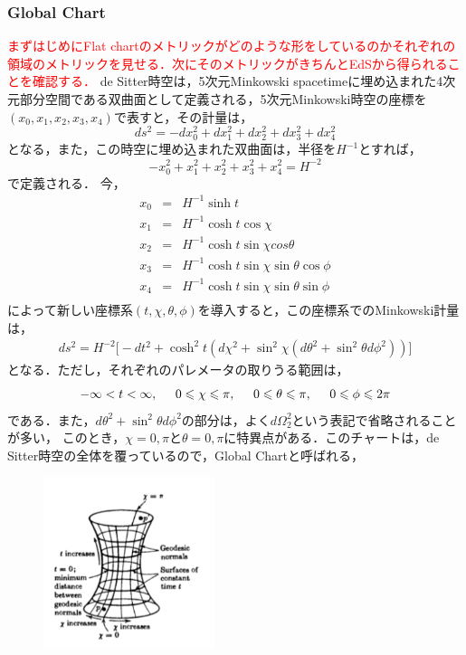 \subsubsection{Global Chart}
\textcolor{red}{まずはじめにFlat chartのメトリックがどのような形をしているのかそれぞれの領域のメトリックを見せる．次にそのメトリックがきちんとEdSから得られることを確認する．}
de Sitter時空は，5次元Minkowski spacetimeに埋め込まれた4次元部分空間である双曲面として定義される，5次元Minkowski時空の座標を$(x_0,x_1,x_2,x_3,x_4)$で表すと，その計量は，
\begin{equation}
  ds^2=-dx_0^2+dx_1^2+dx_2^2+dx_3^2+dx_4^2
\end{equation}
となる，また，この時空に埋め込まれた双曲面は，半径を$H^{-1}$とすれば，
\begin{equation}
  \label{1.2}
  -x_0^2+x_1^2+x_2^2+x_3^2+x_4^2=H^{-2}
\end{equation}
で定義される．
今，
\begin{eqnarray}
  x_0&=&H^{-1}\sinh{t} \\
  x_1&=&H^{-1}\cosh{t}\cos{\chi} \\
  x_2&=&H^{-1}\cosh{t}\sin{\chi}cos{\theta} \\
  x_3&=&H^{-1}\cosh{t}\sin{\chi}\sin{\theta}\cos{\phi} \\
  x_4&=&H^{-1}\cosh{t}\sin{\chi}\sin{\theta}\sin{\phi} \\
\end{eqnarray}
によって新しい座標系$(t,\chi,\theta,\phi)$を導入すると，この座標系でのMinkowski計量は，
\begin{eqnarray}
  ds^2=H^{-2}\biggr[-dt^2+\cosh^2{t}(d\chi^2+\sin^2\chi(d\theta^2+\sin^2\theta d\phi^2))\biggr]
\end{eqnarray}
となる．ただし，それぞれのパレメータの取りうる範囲は，
\begin{eqnarray}
  -\infty< t < \infty,\hspace{0.5cm} 0 \leqslant \chi \leqslant \pi,\hspace{0.5cm} 0 \leqslant \theta \leqslant \pi, \hspace{0.5cm} 0 \leqslant \phi \leqslant 2\pi
\end{eqnarray}である．また，$d\theta^2+\sin^2\theta d\phi^2$の部分は，よく$d\Omega_2^2$という表記で省略されることが多い，
このとき，$\chi=0,\pi$と$\theta=0,\pi$に特異点がある．このチャートは，de Sitter時空の全体を覆っているので，Global Chartと呼ばれる，
\begin{figure}[H]
\begin{center}
  \includegraphics[width=5cm,angle=0]{deSitter.pdf}
  　　　\caption{}
  　　\label{desitter}
\end{center}
\end{figure}
